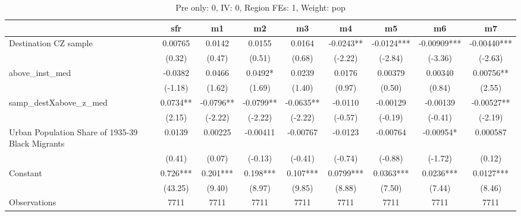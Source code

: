 \begin{table}[htbp]\centering
\def\sym#1{\ifmmode^{#1}\else\(^{#1}\)\fi}
\caption{Pre only: 0, IV: 0, Region FEs: 1, Weight: pop}
\begin{tabular}{l*{8}{c}}
\toprule
                    &\multicolumn{1}{c}{sfr}&\multicolumn{1}{c}{m1}&\multicolumn{1}{c}{m2}&\multicolumn{1}{c}{m3}&\multicolumn{1}{c}{m4}&\multicolumn{1}{c}{m5}&\multicolumn{1}{c}{m6}&\multicolumn{1}{c}{m7}\\
\midrule
Destination CZ sample&     0.00765   &      0.0142   &      0.0155   &      0.0164   &     -0.0243** &     -0.0124***&    -0.00909***&    -0.00440***\\
                    &      (0.32)   &      (0.47)   &      (0.51)   &      (0.68)   &     (-2.22)   &     (-2.84)   &     (-3.36)   &     (-2.63)   \\
\addlinespace
above\_inst\_med      &     -0.0382   &      0.0466   &      0.0492*  &      0.0239   &      0.0176   &     0.00379   &     0.00340   &     0.00756** \\
                    &     (-1.18)   &      (1.62)   &      (1.69)   &      (1.40)   &      (0.97)   &      (0.50)   &      (0.84)   &      (2.55)   \\
\addlinespace
samp\_destXabove\_z\_med&      0.0734** &     -0.0796** &     -0.0799** &     -0.0635** &     -0.0110   &    -0.00129   &    -0.00139   &    -0.00527** \\
                    &      (2.15)   &     (-2.22)   &     (-2.22)   &     (-2.22)   &     (-0.57)   &     (-0.19)   &     (-0.41)   &     (-2.19)   \\
\addlinespace
Urban Population Share of 1935-39 Black Migrants&      0.0139   &     0.00225   &    -0.00411   &    -0.00767   &     -0.0123   &    -0.00764   &    -0.00954*  &    0.000587   \\
                    &      (0.41)   &      (0.07)   &     (-0.13)   &     (-0.41)   &     (-0.74)   &     (-0.88)   &     (-1.72)   &      (0.12)   \\
\addlinespace
Constant            &       0.726***&       0.201***&       0.198***&       0.107***&      0.0799***&      0.0363***&      0.0236***&      0.0127***\\
                    &     (43.25)   &      (9.40)   &      (8.97)   &      (9.85)   &      (8.88)   &      (7.50)   &      (7.44)   &      (8.46)   \\
\midrule
Observations        &        7711   &        7711   &        7711   &        7711   &        7711   &        7711   &        7711   &        7711   \\

\end{tabular}
\end{table}
